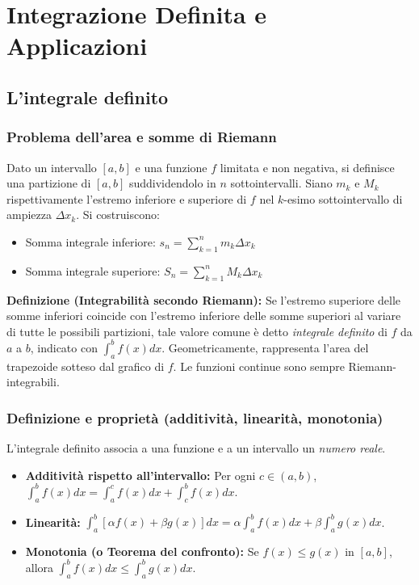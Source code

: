 \section{Integrazione Definita e Applicazioni}
\subsection{L'integrale definito}
\subsubsection{Problema dell'area e somme di Riemann}
Dato un intervallo $[a,b]$ e una funzione $f$ limitata e non negativa, si definisce una partizione di $[a,b]$ suddividendolo in $n$ sottointervalli. 
Siano $m_k$ e $M_k$ rispettivamente l'estremo inferiore e superiore di $f$ nel $k$-esimo sottointervallo di ampiezza $\Delta x_k$. Si costruiscono:
\begin{itemize}
    \item Somma integrale inferiore: $s_n = \sum_{k=1}^n m_k \Delta x_k$
    \item Somma integrale superiore: $S_n = \sum_{k=1}^n M_k \Delta x_k$
\end{itemize}
\textbf{Definizione (Integrabilità secondo Riemann):} Se l'estremo superiore delle somme inferiori coincide con l'estremo inferiore delle somme superiori al variare di tutte le possibili partizioni, tale valore comune è detto \textit{integrale definito} di $f$ da $a$ a $b$, indicato con $\int_a^b f(x) dx$. Geometricamente, rappresenta l'area del trapezoide sotteso dal grafico di $f$. Le funzioni continue sono sempre Riemann-integrabili.

\subsubsection{Definizione e proprietà (additività, linearità, monotonia)}
L'integrale definito associa a una funzione e a un intervallo un \textit{numero reale}.
\begin{itemize}
    \item \textbf{Additività rispetto all'intervallo:} Per ogni $c \in (a,b)$, $\int_a^b f(x) dx = \int_a^c f(x) dx + \int_c^b f(x) dx$.
    \item \textbf{Linearità:} $\int_a^b [\alpha f(x) + \beta g(x)] dx = \alpha \int_a^b f(x) dx + \beta \int_a^b g(x) dx$.
    \item \textbf{Monotonia (o Teorema del confronto):} Se $f(x) \le g(x)$ in $[a,b]$, allora $\int_a^b f(x) dx \le \int_a^b g(x) dx$.
\end{itemize}

